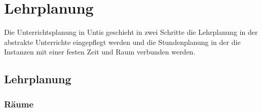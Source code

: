 
\chapter{Lehrplanung}
\label{chap:lessons}

Die Unterrichtsplanung in Untis geschieht in zwei Schritte die Lehrplanung in der abstrakte Unterrichte eingepflegt werden und die Stundenplanung in der die Instanzen mit einer festen Zeit und Raum verbunden werden.

\section{Lehrplanung}
\label{sec:lehrplanung}


\subsection{Räume}
\label{subsec:rooms}